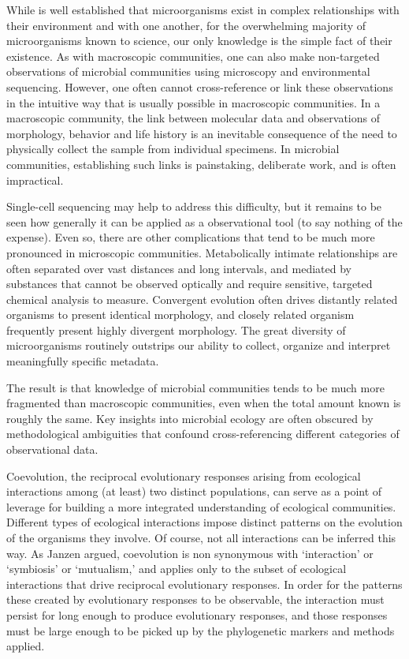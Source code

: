 
While is well established that microorganisms exist in complex relationships with their environment and with one another, for the overwhelming majority of microorganisms known to science, our only knowledge is the simple fact of their existence. As with macroscopic communities, one can also make non-targeted observations of microbial communities using microscopy and environmental sequencing. However, one often cannot cross-reference or link these observations in the intuitive way that is usually possible in macroscopic communities. In a macroscopic community, the link between molecular data and observations of morphology, behavior and life history is an inevitable consequence of the need to physically collect the sample from individual specimens. In microbial communities, establishing such links is painstaking, deliberate work, and is often impractical. 

Single-cell sequencing may help to address this difficulty, but it remains to be seen how generally it can be applied as a observational tool (to say nothing of the expense). Even so, there are other complications that tend to be much more pronounced in microscopic communities. Metabolically intimate relationships are often separated over vast distances and long intervals, and mediated by substances that cannot be observed optically and require sensitive, targeted chemical analysis to measure. Convergent evolution often drives distantly related organisms to present identical morphology, and closely related organism frequently present highly divergent morphology. The great diversity of microorganisms routinely outstrips our ability to collect, organize and interpret meaningfully specific metadata.

The result is that knowledge of microbial communities tends to be much more fragmented than macroscopic communities, even when the total amount known is roughly the same. Key insights into microbial ecology are often obscured by methodological ambiguities that confound cross-referencing different categories of observational data. 

Coevolution, the reciprocal evolutionary responses arising from ecological interactions among (at least) two distinct populations, can serve as a point of leverage for building a more integrated understanding of ecological communities. Different types of ecological interactions impose distinct patterns on the evolution of the organisms they involve. Of course, not all interactions can be inferred this way. As Janzen argued, coevolution is non synonymous with `interaction' or `symbiosis' or `mutualism,' and applies only to the subset of ecological interactions that drive reciprocal evolutionary responses. \cite{janzen1980coevolution} In order for the patterns these created by evolutionary responses to be observable, the interaction must persist for long enough to produce evolutionary responses, and those responses must be large enough to be picked up by the phylogenetic markers and methods applied.

